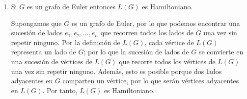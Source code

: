 \begin{ejercicio}
\begin{enumerate}
        \item Si $G$ es un grafo de Euler entonces $L(G)$ es Hamiltoniano.
        
        Supongamos que $G$ es un grafo de Euler, por lo que podemos encontrar una sucesión de lados $e_1,e_2,\ldots,e_n$ que recorren todos los lados de $G$ una vez sin repetir ninguno. Por la definición de $L(G)$, cada vértice de $L(G)$ representa un lado de $G$; por lo que la sucesión de lados de $G$ se convierte en una sucesión de vértices de $L(G)$ que recorre todos los vértices de $L(G)$ una vez sin repetir ninguno. Además, esto es posible porque dos lados adyacentes en $G$ comparten un vértice, por lo que serán vértices adyacentes en $L(G)$. Por tanto, $L(G)$ es Hamiltoniano.
    \end{enumerate}
\end{ejercicio}

